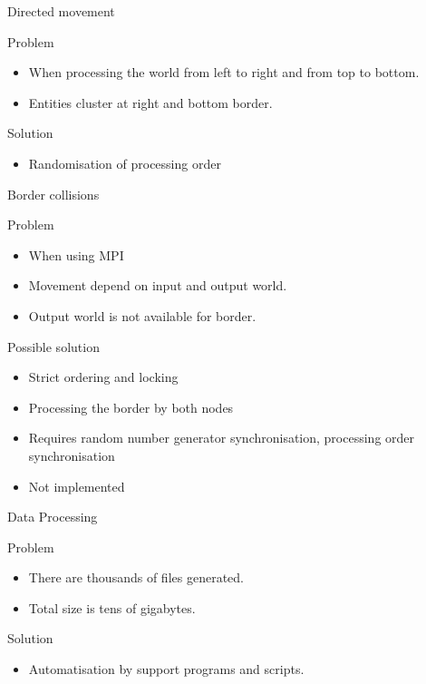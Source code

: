 \documentclass{beamer}
\begin{document}
\begin{frame}{Directed movement}
    \begin{block}{Problem}
        \begin{itemize}
            \item When processing the world from left to right and from top to bottom.
            \item Entities cluster at right and bottom border.
        \end{itemize}
    \end{block}
    \begin{block}{Solution}
        \begin{itemize}
            \item Randomisation of processing order
        \end{itemize}
    \end{block}
\end{frame}

\begin{frame}{Border collisions}
    \begin{block}{Problem}
        \begin{itemize}
            \item When using MPI
            \item Movement depend on input and output world.
            \item Output world is not available for border.
        \end{itemize}
    \end{block}
    \begin{block}{Possible solution}
        \begin{itemize}
            \item Strict ordering and locking
            \item Processing the border by both nodes
            \item Requires random number generator synchronisation, processing order synchronisation
            \item Not implemented
        \end{itemize} 
    \end{block}
\end{frame}

\begin{frame}{Data Processing}
    \begin{block}{Problem}
        \begin{itemize}
            \item There are thousands of files generated.
            \item Total size is tens of gigabytes.
        \end{itemize}
    \end{block}
    \begin{block}{Solution}
        \begin{itemize}
            \item Automatisation by support programs and scripts.
        \end{itemize}
    \end{block}
\end{frame}
\end{document}
